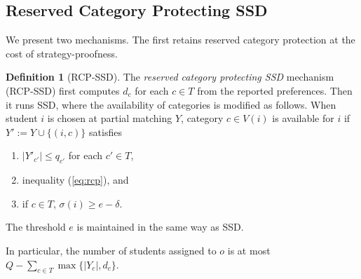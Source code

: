 \documentclass[a4paper,twoside]{article}
\theoremstyle{definition}
\newtheorem{definition}{Definition}
\begin{document}
\subsection{Reserved Category Protecting SSD}

We present two mechanisms. The first retains reserved category protection at the cost of
strategy-proofness.

\begin{definition}[RCP-SSD]
\label{def:rcpssd}
The \emph{reserved category protecting SSD} mechanism (RCP-SSD) first computes $d_c$ for
each $c\in T$ from the reported preferences.
Then it runs SSD, where the availability of categories is modified as follows.
When student $i$ is chosen at partial matching $Y$, category $c\in V(i)$ is available
for $i$ if $Y':=Y\cup\{(i,c)\}$ satisfies
\begin{enumerate}
\item $|Y'_{c'}|\le q_{c'}$ for each $c'\in T$,
\item inequality (\ref{eq:rcp}), and
\item if $c\in T$, $\sigma(i)\ge e-\delta$.
\end{enumerate}
The threshold $e$ is maintained in the same way as SSD.
\end{definition}

In particular, the number of students assigned to $o$ is at most
$Q-\sum_{c\in T}\max\{|Y_c|,d_c\}$.
\end{document}
